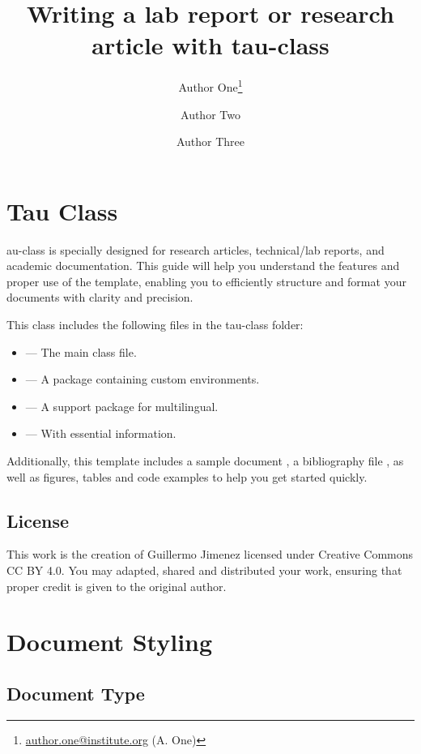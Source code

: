 \documentclass[9pt,a4paper,twocolumn,twoside]{tau-class/tau}
\title{Writing a lab report or research article with tau-class}
\author[a,1]{Author One\thanks{\href{mailto:author.one@institute.org}{author.one@institute.org} (A. One)}}
\author[b,2]{Author Two}
\author[c,3]{Author Three}
\affil[a]{Affiliation One}
\affil[b]{Affiliation Two}
\affil[c]{Affiliation Three}
\begin{document}
		
    \maketitle 
    \thispagestyle{firststyle}
    

\section{Tau Class}

    au-class is specially designed for research articles, technical/lab reports, and academic documentation. This guide will help you understand the features and proper use of the template, enabling you to efficiently structure and format your documents with clarity and precision.

    This class includes the following files in the tau-class folder:
	
	\begin{itemize}
		\item {} — The main class file.
		\item {} — A package containing custom environments.
		\item {} — A support package for multilingual.
		\item {} — With essential information.
	\end{itemize}

    Additionally, this template includes a sample document , a bibliography file , as well as figures, tables and code examples to help you get started quickly.

    \subsection{License}
    
        This work is the creation of Guillermo Jimenez licensed under Creative Commons CC BY 4.0. You may adapted, shared and distributed your work, ensuring that proper credit is given to the original author.

\section{Document Styling}

    \subsection{Document Type}
\end{document}
